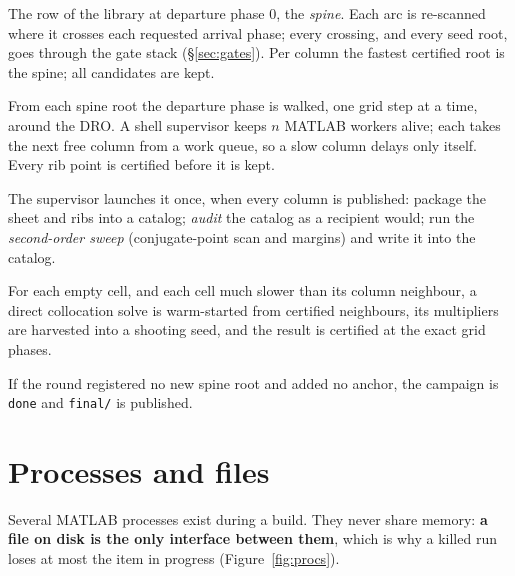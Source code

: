 \documentclass[11pt]{article}
\renewcommand{\_}{\textunderscore\allowbreak}
\newcommand{\code}[1]{\texttt{#1}}
\newcommand{\file}[1]{\texttt{\small #1}}
\begin{document}
\begin{description}[leftmargin=1.1cm, style=nextline, itemsep=3pt]
\item[Arrival sheet (\code{build\_arrival\_sheet})] The row of the library
  at departure phase 0, the \emph{spine}. Each arc is re-scanned where it
  crosses each requested arrival phase; every crossing, and every seed root,
  goes through the gate stack (\S\ref{sec:gates}). Per column the fastest
  certified root is the spine; all candidates are kept.
\item[Ribs (\code{run\_costate\_library}, \code{rib\_from\_crossing})] From
  each spine root the departure phase is walked, one grid step at a time,
  around the DRO. A shell supervisor keeps $n$ MATLAB workers alive; each
  takes the next free column from a work queue, so a slow column delays only
  itself. Every rib point is certified before it is kept.
\item[Finalizer] The supervisor launches it once, when every column is
  published: package the sheet and ribs into a catalog; \emph{audit} the
  catalog as a recipient would; run the \emph{second-order sweep}
  (conjugate-point scan and margins) and write it into the catalog.
\item[Holes and improve (\code{fill\_holes\_direct})] For each empty cell,
  and each cell much slower than its column neighbour, a direct collocation
  solve is warm-started from certified neighbours, its multipliers are
  harvested into a shooting seed, and the result is certified at the exact
  grid phases.
\item[Fixed point] If the round registered no new spine root and added no
  anchor, the campaign is \code{done} and \file{final/} is published.
\end{description}

\section{Processes and files}

Several MATLAB processes exist during a build. They never share memory:
\textbf{a file on disk is the only interface between them}, which is why a
killed run loses at most the item in progress (Figure~\ref{fig:procs}).
\end{document}
